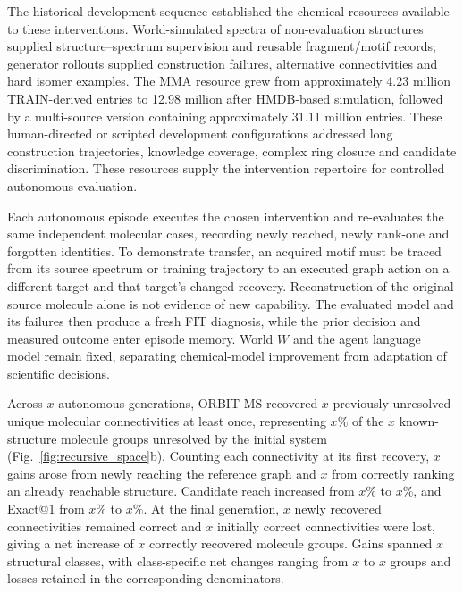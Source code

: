 \documentclass[11pt]{article}
\newcommand{\pending}[1]{\ensuremath{x}}
\begin{document}
The historical development sequence established the chemical resources available to these interventions. World-simulated spectra of non-evaluation structures supplied structure--spectrum supervision and reusable fragment/motif records; generator rollouts supplied construction failures, alternative connectivities and hard isomer examples. The MMA resource grew from approximately 4.23 million TRAIN-derived entries to 12.98 million after HMDB-based simulation, followed by a multi-source version containing approximately 31.11 million entries. These human-directed or scripted development configurations addressed long construction trajectories, knowledge coverage, complex ring closure and candidate discrimination. These resources supply the intervention repertoire for controlled autonomous evaluation.

Each autonomous episode executes the chosen intervention and re-evaluates the same independent molecular cases, recording newly reached, newly rank-one and forgotten identities. To demonstrate transfer, an acquired motif must be traced from its source spectrum or training trajectory to an executed graph action on a different target and that target's changed recovery. Reconstruction of the original source molecule alone is not evidence of new capability. The evaluated model and its failures then produce a fresh FIT diagnosis, while the prior decision and measured outcome enter episode memory. World \(W\) and the agent language model remain fixed, separating chemical-model improvement from adaptation of scientific decisions.

Across \pending{rsi-generations} autonomous generations, ORBIT-MS recovered \(\pending{r3-01}\) previously unresolved unique molecular connectivities at least once, representing \(\pending{r3-02}\%\) of the \(\pending{r3-03}\) known-structure molecule groups unresolved by the initial system (Fig.~\ref{fig:recursive_space}b). Counting each connectivity at its first recovery, \(\pending{r3-04}\) gains arose from newly reaching the reference graph and \(\pending{r3-05}\) from correctly ranking an already reachable structure. Candidate reach increased from \(\pending{r3-06}\%\) to \(\pending{r3-07}\%\), and Exact@1 from \(\pending{r3-08}\%\) to \(\pending{r3-09}\%\). At the final generation, \(\pending{r3-10}\) newly recovered connectivities remained correct and \(\pending{r3-11}\) initially correct connectivities were lost, giving a net increase of \(\pending{r3-12}\) correctly recovered molecule groups. Gains spanned \(\pending{r3-13}\) structural classes, with class-specific net changes ranging from \(\pending{r3-14}\) to \(\pending{r3-15}\) groups and losses retained in the corresponding denominators.
\end{document}
